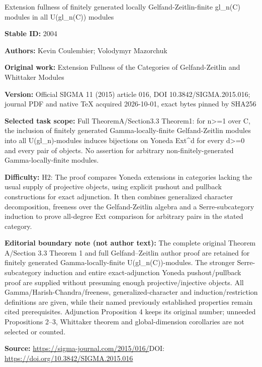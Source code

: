 \documentclass[11pt]{article}
\begin{document}
\begin{center}\Large Extension fullness of finitely generated locally Gelfand-Zeitlin-finite gl\_n(C) modules in all U(gl\_n(C)) modules\end{center}
\noindent\textbf{Stable ID:} 2004\par
\noindent\textbf{Authors:} Kevin Coulembier; Volodymyr Mazorchuk\par
\noindent\textbf{Original work:} Extension Fullness of the Categories of Gelfand-Zeitlin and Whittaker Modules\par
\noindent\textbf{Version:} Official SIGMA 11 (2015) article 016, DOI 10.3842/SIGMA.2015.016; journal PDF and native TeX acquired 2026-10-01, exact bytes pinned by SHA256\par
\noindent\textbf{Selected task scope:} Full TheoremA/Section3.3 Theorem1: for n>=\allowbreak{}1 over C, the inclusion of finitely generated Gamma-locally-finite Gelfand-Zeitlin modules into all U(gl\_n)-modules induces bijections on Yoneda Ext\textasciicircum{}d for every d>=\allowbreak{}0 and every pair of objects. No assertion for arbitrary non-finitely-generated Gamma-locally-finite modules.\par
\noindent\textbf{Difficulty:} H2: The proof compares Yoneda extensions in categories lacking the usual supply of projective objects, using explicit pushout and pullback constructions for exact adjunction. It then combines generalized character decomposition, freeness over the Gelfand-Zeitlin algebra and a Serre-subcategory induction to prove all-degree Ext comparison for arbitrary pairs in the stated category.\par
\noindent\textbf{Editorial boundary note (not author text):} The complete original Theorem A/Section 3.3 Theorem 1 and full Gelfand–Zeitlin author proof are retained for finitely generated Gamma-locally-finite U(gl\_n(C))-modules. The stronger Serre-subcategory induction and entire exact-adjunction Yoneda pushout/pullback proof are supplied without presuming enough projective/injective objects. All Gamma/Harish-Chandra/freeness, generalized-character and induction/restriction definitions are given, while their named previously established properties remain cited prerequisites. Adjunction Proposition 4 keeps its original number; unneeded Propositions 2–3, Whittaker theorem and global-dimension corollaries are not selected or counted.\par
\noindent\textbf{Source:} \url{https://sigma-journal.com/2015/016/}\quad DOI: \url{https://doi.org/10.3842/SIGMA.2015.016}\par
\end{document}

